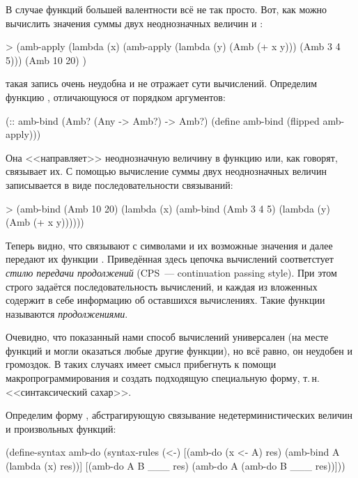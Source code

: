 В случае функций большей валентности всё не так просто. Вот, как можно вычислить значения суммы двух неоднозначных величин  и :
\begin{SchemeCode}[emph={x,y}]
   > (amb-apply 
      (lambda (x) 
        (amb-apply 
         (lambda (y) 
           (Amb (+ x y))) 
         (Amb 3 4 5)))
      (Amb 10 20) )
\end{SchemeCode}\vspace{-\medskipamount}
 такая запись очень неудобна и не отражает сути вычислений. Определим функцию , отличающуюся от  порядком аргументов:
\newpage
\begin{Definition}
(:: amb-bind (Amb? (Any -> Amb?) -> Amb?)
  (define amb-bind (flipped amb-apply)))
\end{Definition}
Она <<направляет>> неоднозначную величину в функцию или, как говорят, связывает их. С помощью  вычисление суммы двух неоднозначных величин записывается в виде последовательности связываний:
\begin{SchemeCode}[emph={x,y}]
  > (amb-bind 
     (Amb 10 20) (lambda (x) 
                   (amb-bind 
                     (Amb 3 4 5) (lambda (y) 
                                   (Amb (+ x y))))))
\end{SchemeCode}\vspace{-\medskipamount}
Теперь видно, что  связывают с символами  и  их возможные значения и далее передают их функции \s{+}. Приведённая здесь цепочка вычислений соответстует \emph{стилю передачи продолжений} (CPS~--- continuation passing style). При этом строго задаётся последовательность вычислений, и каждая из вложенных  содержит в себе информацию об оставшихся вычислениях. Такие функции называются \emph{продолжениями}.

Очевидно, что показанный нами способ вычислений универсален (на месте функций   и \s{+} могли оказаться любые другие функции), но всё равно, он неудобен и громоздок. В таких случаях имеет смысл прибегнуть к помощи макропрограммирования и создать подходящую специальную форму, т.\,н. <<синтаксический сахар>>.

Определим форму , абстрагирующую связывание недетерминистических величин и произвольных функций:

\begin{Definition}[emph={x,A,res,B}]
(define-syntax amb-do
  (syntax-rules (<-) 
    [(amb-do (x <- A) res) (amb-bind A (lambda (x) res))]
    [(amb-do A B ___ res)  (amb-do A (amb-do B ___ res))]))
\end{Definition}

